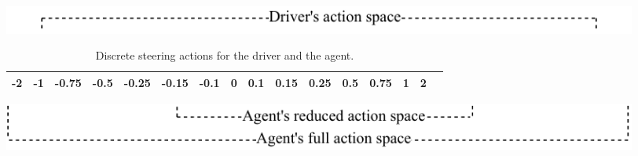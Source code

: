 \begin{table}[htbp]
\footnotesize
\centering
\centerfloat
\setlength{\tabcolsep}{5pt}
\includegraphics[width=0.925\textwidth]{figures/driver-actions.pdf}
\begin{tabular}{@{}cccccccccccccccc@{}}
\toprule
 -2& -1     & -0.75  & -0.5   & -0.25  & -0.15  & -0.1   & 0     & 0.1   & 0.15  & 0.25  & 0.5   & 0.75  & 1 & 2 \\ \bottomrule
\end{tabular}
\includegraphics[width=0.925\textwidth]{figures/agent-actions.pdf}
\caption[Discrete steering actions for the driver and the agent]{Discrete steering actions for the driver and the agent.}
\label{tab:actions}
\end{table} 